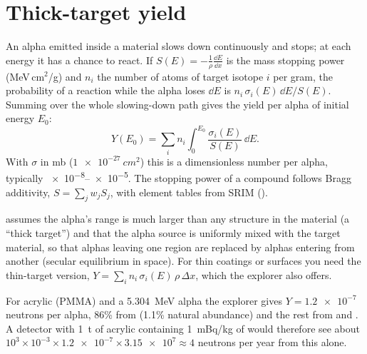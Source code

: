 \section{Thick-target yield}
An alpha emitted inside a material slows down continuously and stops; at each energy it has a chance to react. If $S(E) = -\frac{1}{\rho}\frac{\dd E}{\dd x}$ is the mass stopping power (MeV\,cm$^2$/g) and $n_i$ the number of atoms of target isotope $i$ per gram, the probability of a reaction while the alpha loses $\dd E$ is $n_i\,\sigma_i(E)\,\dd E/S(E)$. Summing over the whole slowing-down path gives the yield per alpha of initial energy $E_0$:
\begin{equation}
Y(E_0) = \sum_i n_i \int_0^{E_0} \frac{\sigma_i(E)}{S(E)}\,\dd E .
\label{eq:yield}
\end{equation}
With $\sigma$ in mb ($\SI{1e-27}{cm^2}$) this is a dimensionless number per alpha, typically \numrange{e-8}{e-5}. The stopping power of a compound follows Bragg additivity, $S = \sum_j w_j S_j$, with element tables from SRIM \cite{srim} ().

 assumes the alpha's range is much larger than any structure in the material (a ``thick target'') and that the alpha source is uniformly mixed with the target material, so that alphas leaving one region are replaced by alphas entering from another (secular equilibrium in space). For thin coatings or surfaces you need the thin-target version, $Y = \sum_i n_i\,\sigma_i(E)\,\rho\,\Delta x$, which the explorer also offers.

\begin{keyidea}
For acrylic (PMMA) and a \SI{5.304}{MeV}  alpha the explorer gives $Y = \num{1.2e-7}$ neutrons per alpha, 86\% from  (1.1\% natural abundance) and the rest from  and . A detector with \SI{1}{t} of acrylic containing \SI{1}{mBq/kg} of  would therefore see about $10^3\times10^{-3}\times\num{1.2e-7}\times\num{3.15e7} \approx 4$ neutrons per year from this alone.
\end{keyidea}

